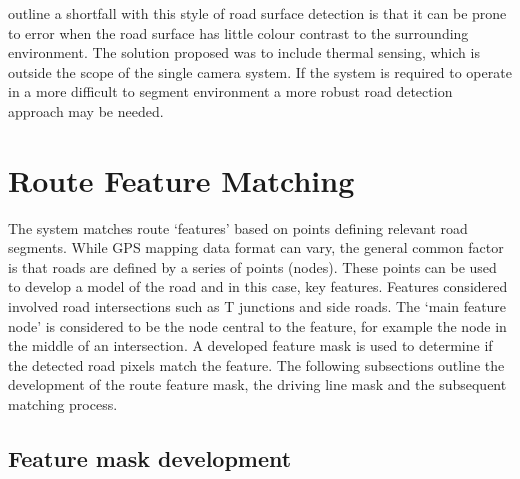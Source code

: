 \documentclass[]{aiaa-tc}%
\begin{document}


\citet{histBackRefineShadows} outline a shortfall with this style of road surface detection is that it can be prone to error when the road surface has little colour contrast to the surrounding environment. The solution proposed was to include thermal sensing, which is outside the scope of the single camera system. If the system is required to operate in a more difficult to segment environment a more robust road detection approach may be needed. 


\section{Route Feature Matching}\label{sect:route_feature_matching}

The system matches route `features' based on points defining relevant road segments. While GPS mapping data format can vary, the general common factor is that roads are defined by a series of points (nodes). These points can be used to develop a model of the road and in this case, key features. Features considered involved road intersections such as T junctions and side roads. The `main feature node' is considered to be the node central to the feature, for example the node in the middle of an intersection. A developed feature mask is used to determine if the detected road pixels match the feature. The following subsections outline the development of the route feature mask, the driving line mask and the subsequent matching process.

\subsection{Feature mask development} \label{s:maskDevelopment}
\end{document}

